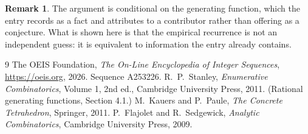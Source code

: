 \documentclass[11pt,a4paper]{article}
\theoremstyle{plain}
\theoremstyle{definition}
\newtheorem{remark}[theorem]{Remark}
\begin{document}
\begin{remark}
The argument is conditional on the generating function, which the entry records as a fact and
attributes to a contributor rather than offering as a conjecture. What is shown here is that
the empirical recurrence is not an independent guess: it is equivalent to information the
entry already contains.
\end{remark}

\begin{thebibliography}{9}
 The OEIS Foundation, \emph{The On-Line Encyclopedia of Integer
Sequences}, \url{https://oeis.org}, 2026. Sequence A253226.
 R.~P.~Stanley, \emph{Enumerative Combinatorics}, Volume 1, 2nd ed.,
Cambridge University Press, 2011. (Rational generating functions, Section 4.1.)
 M.~Kauers and P.~Paule, \emph{The Concrete Tetrahedron}, Springer, 2011.
 P.~Flajolet and R.~Sedgewick, \emph{Analytic Combinatorics}, Cambridge
University Press, 2009.
\end{thebibliography}
\end{document}
